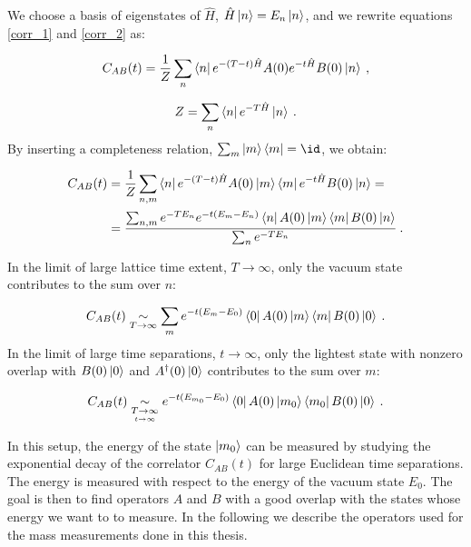 We choose a basis of eigenstates of $\hat H$, $\hat H \ket{n} = E_n \ket{n}$, and we rewrite equations \ref{corr_1} and \ref{corr_2} as:

\begin{equation}
C_{AB}(t) = \frac{1}{Z} \sum_n \bra{n} e^{-(T-t)\hat H} A(0) e^{-t \hat H} B(0) \ket{n}\: ,
\end{equation}

\begin{equation}
Z = \sum_n \bra{n} e^{-T \hat H} \ket{n} \: .
\end{equation}
%
By inserting a completeness relation, $\sum_m \ket{m} \bra{m} = \id$, we obtain:

\begin{equation}
\begin{split}
C_{AB}(t) & = \frac{1}{Z} \sum_{n,m} \bra{n} e^{-(T-t)\hat H} A(0)\ket{m} \bra{m} e^{-t \hat H} B(0) \ket{n} = \\
& = \frac{\sum _{n,m}e^{-TE_n} e^{-t(E_m-E_n)}\bra{n} A(0) \ket{m} \bra{m} B(0) \ket{n}}{\sum_n e^{-TE_n}} \: .
\end{split}
\end{equation}


In the limit of large lattice time extent, $T \to \infty$, only the vacuum state contributes to the sum over $n$:

\begin{equation}
C_{AB}(t) \underset{T \to \infty}{\sim}  \sum _{m}e^{-t(E_m-E_0)}\bra{0} A(0) \ket{m} \bra{m} B(0) \ket{0} \: .
\end{equation}
%
In the limit of large time separations, $t \to \infty$, only the lightest state with nonzero overlap with $B(0)\ket{0}$ and $A^{\dagger}(0) \ket{0}$ contributes to the sum over $m$:

\begin{equation}
C_{AB}(t) \underset{\underset{t \to \infty}{T \to \infty}}{\sim} e^{-t(E_{m_0}-E_0)}\bra{0} A(0) \ket{m_0} \bra{m_0} B(0) \ket{0} \: .
\label{corr_lowest_energy}
\end{equation}

In this setup, the energy of the state $\ket{m_0}$ can be measured by studying the exponential decay of the correlator $C_{AB}(t)$ for large Euclidean time separations. The energy is measured with respect to the energy of the vacuum state $E_0$. The goal is then to find operators $A$ and $B$ with a good overlap with the states whose energy we want to to measure. In the following we describe the operators used for the mass measurements done in this thesis.
 


